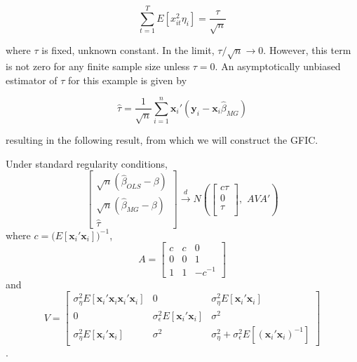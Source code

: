 \begin{equation}
\sum_{t=1}^T E[x_{it}^2 \eta_i] = \frac{\tau}{\sqrt{n}}
\end{equation}

where $\tau$ is fixed, unknown constant. In the limit, $\tau/\sqrt{n} \rightarrow 0$. However, this term is not zero for any finite sample size unless $\tau =0$. An asymptotically unbiased estimator of $\tau$ for this example is given by

\begin{equation}
\widehat{\tau} = \frac{1}{\sqrt{n}} \sum_{i=1}^n \mathbf{x}_i' (\mathbf{y}_i - \mathbf{x}_i \widehat{\beta}_{MG})
\end{equation}

resulting in the following result, from which we will construct the GFIC. 

\begin{thm}
\label{thm:OLSvsMG}
  Under standard regularity conditions,
\[
  \left[\begin{array}{c}
\sqrt{n} (\widehat{\beta}_{OLS} - \beta)\\
\sqrt{n} (\widehat{\beta}_{MG} - \beta)\\
\widehat{\tau}
\end{array}\right] \overset{d}{\rightarrow} N \left( 
\left[\begin{array}{c}
c\tau \\
0  \\
\tau\\
\end{array}\right],  
\,\,A V A' \right)
\]
where $c = \big(E[\mathbf{x}_i' \mathbf{x}_i] \big)^{-1}$, 
\[
A = \left[\begin{array}{ccc}
c  & c& 0\\
0& 0 & 1\\
1 & 1 & -c^{-1}
\end{array}\right] \]
and
\[
V = \left[\begin{array}{ccc}
\sigma_\eta^2 E[\mathbf{x}_i'\mathbf{x}_i\mathbf{x}_i' \mathbf{x}_i]  & 0  & \sigma_\eta^2 E[\mathbf{x}_i' \mathbf{x}_i] \\
0 & \sigma_\epsilon^2 E[\mathbf{x}_i'\mathbf{x}_i] & \sigma^2\\ 
\sigma_\eta^2 E[\mathbf{x}_i'\mathbf{x}_i] & \sigma^2 & \sigma_\eta^2 + \sigma_\epsilon^2 E[(\mathbf{x}_i'\mathbf{x}_i)^{-1} ]
\end{array}\right] \].\\
\end{thm}



